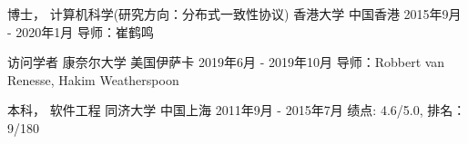 

\begin{cventries}


\cventry
{博士， 计算机科学(研究方向：分布式一致性协议)} %
{香港大学} %
{中国香港} %
{2015年9月 - 2020年1月} %
{ %
导师：崔鹤鸣
}


\cventry
{访问学者} %
{康奈尔大学} %
{美国伊萨卡} %
{2019年6月 - 2019年10月} %
{ %
导师：Robbert van Renesse, Hakim Weatherspoon
}


\cventry
{本科， 软件工程} %
{同济大学} %
{中国上海} %
{2011年9月 - 2015年7月} %
{ %
绩点: 4.6/5.0, 排名：9/180
}

\end{cventries}
